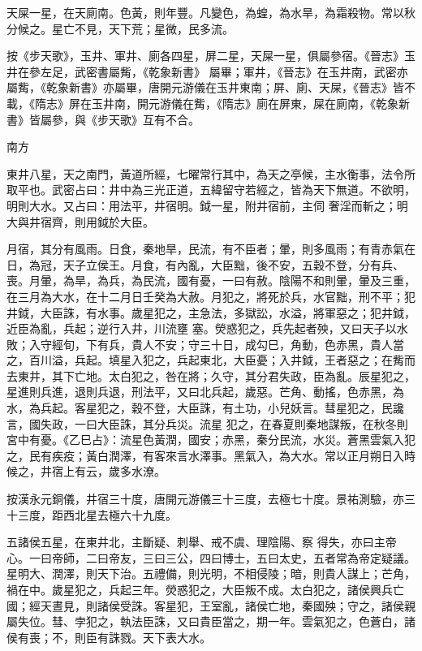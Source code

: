 \begin{pinyinscope}
 天屎一星，在天廁南。色黃，則年豐。凡變色，為蝗，為水旱，為霜殺物。常以秋分候之。星亡不見，天下荒；星微，民多流。



 按《步天歌》，玉井、軍井、廁各四星，屏二星，天屎一星，俱屬參宿。《晉志》玉井在參左足，武密書屬觜，《乾象新書》
 屬畢；軍井，《晉志》在玉井南，武密亦屬觜，《乾象新書》亦屬畢，唐開元游儀在玉井東南；屏、廁、天屎，《晉志》皆不載，《隋志》屏在玉井南，開元游儀在觜，《隋志》廁在屏東，屎在廁南，《乾象新書》皆屬參，與《步天歌》互有不合。



 南方



 東井八星，天之南門，黃道所經，七曜常行其中，為天之亭候，主水衡事，法令所取平也。武密占曰：井中為三光正道，五緯留守若經之，皆為天下無道。不欲明，明則大水。又占曰：用法平，井宿明。鉞一星，附井宿前，主伺
 奢淫而斬之；明大與井宿齊，則用鉞於大臣。



 月宿，其分有風雨。日食，秦地旱，民流，有不臣者；暈，則多風雨；有青赤氣在日，為冠，天子立侯王。月食，有內亂，大臣黜，後不安，五穀不登，分有兵、喪。月暈，為旱，為兵，為民流，國有憂，一曰有赦。陰陽不和則暈，暈及三重，在三月為大水，在十二月日壬癸為大赦。月犯之，將死於兵，水官黜，刑不平；犯井鉞，大臣誅，有水事。歲星犯之，主急法，多獄訟，水溢，將軍惡之；犯井鉞，近臣為亂，兵起；逆行入井，川流壅
 塞。熒惑犯之，兵先起者殃，又曰天子以水敗；入守經旬，下有兵，貴人不安；守三十日，成勾巳，角動，色赤黑，貴人當之，百川溢，兵起。填星入犯之，兵起東北，大臣憂；入井鉞，王者惡之；在觜而去東井，其下亡地。太白犯之，咎在將；久守，其分君失政，臣為亂。辰星犯之，星進則兵進，退則兵退，刑法平，又曰北兵起，歲惡。芒角、動搖，色赤黑，為水，為兵起。客星犯之，穀不登，大臣誅，有土功，小兒妖言。彗星犯之，民讒言，國失政，一曰大臣誅，其分兵災。流星
 犯之，在春夏則秦地謀叛，在秋冬則宮中有憂。《乙巳占》：流星色黃潤，國安；赤黑，秦分民流，水災。蒼黑雲氣入犯之，民有疾疫；黃白潤澤，有客來言水澤事。黑氣入，為大水。常以正月朔日入時候之，井宿上有云，歲多水潦。



 按漢永元銅儀，井宿三十度，唐開元游儀三十三度，去極七十度。景祐測驗，亦三十三度，距西北星去極六十九度。



 五諸侯五星，在東井北，主斷疑、刺舉、戒不虞、理陰陽、察
 得失，亦曰主帝心。一曰帝師，二曰帝友，三曰三公，四曰博士，五曰太史，五者常為帝定疑議。星明大、潤澤，則天下治。五禮備，則光明，不相侵陵；暗，則貴人謀上；芒角，禍在中。歲星犯之，兵起三年。熒惑犯之，大臣叛不成。太白犯之，諸侯興兵亡國；經天晝見，則諸侯受誅。客星犯，王室亂，諸侯亡地，秦國殃；守之，諸侯親屬失位。彗、孛犯之，執法臣誅，又曰貴臣當之，期一年。雲氣犯之，色蒼白，諸侯有喪；不，則臣有誅戮。天下表大水。




\end{pinyinscope}
